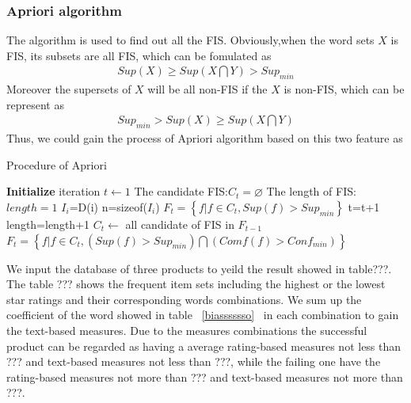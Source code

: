 \documentclass[12pt]{article}%
\begin{document}
\subsubsection{Apriori algorithm}
The algorithm is used to find out all the FIS. Obviously,when the word sets $X$ is FIS,
its subsets are all FIS\cite{bib:66}, which can be fomulated as 
\begin{gather}
Sup(X)\geqslant Sup(X\bigcap Y)>Sup_{min}
\end{gather}
Moreover the supersets of $X$ will be all non-FIS if the $X$ is non-FIS\cite{bib:66}, which can be represent as
\begin{gather}
Sup_{min}>Sup(X)\geqslant Sup(X\bigcap Y)
\end{gather}
Thus, we could gain the process of Apriori algorithm based on this two feature as 

\begin{algorithm}[H]
	\caption{Procedure of Apriori}  
	\LinesNumbered  
\textbf{Initialize} \newline
iteration $t\leftarrow 1$ \newline
 The candidate FIS:$C_{t}=\varnothing$ \newline
 The length of FIS:$length=1$ \newline
        {$I_{i}$=D(i)\newline
        	n=sizeof($I_{i}$)\newline
   }
            $F_{t}=\left \{ f|f\in C_{t},Sup(f)>Sup_{min}\right \}$\newline
     { t=t+1\newline 
     	length=length+1\newline	
     	$C_{t}\leftarrow $ all candidate of FIS in $F_{t-1}$\newline
      $F_{t}=\left \{ f|f\in C_{t},(Sup(f)>Sup_{min})\bigcap (Comf(f)>Conf_{min}) \right\}$\newline
     }	
\end{algorithm} 
We input the database of three products to yeild the result showed in table???. The table ??? shows the frequent item sets including the highest or the lowest star ratings and their corresponding words combinations. We sum up the coefficient of the word showed in table ~\ref{biasssssso}~ in each combination to gain the text-based measures. Due to the measures combinations the successful product can be regarded as having a average rating-based measures not less than ??? and text-based measures not less than ???, while the failing one have the rating-based measures not more than ??? and text-based measures not more than ???.
\end{document}
